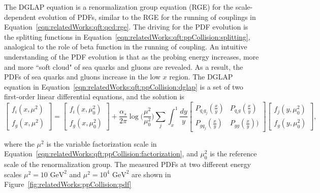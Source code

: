 \noindent The DGLAP equation is a renormalization group equation (RGE) for the scale-dependent evolution of PDFs, similar to the RGE for the running of couplings in Equation~\ref{eqn:relatedWorks:qft:qcd:rge}. The driving for the PDF evolution is the splitting functions in Equation~\ref{eqn:relatedWorks:qft:ppCollision:splitting}, analogical to the role of beta function in the running of coupling.  An intuitive understanding of the PDF evolution is that as the probing energy increases, more and more ``soft cloud" of sea quarks and gluons are revealed. As a result, the PDFs of sea quarks and gluons increase in the low $x$ region. The DGLAP equation in Equation~\ref{eqn:relatedWorks:qft:ppCollision:dglap} is a set of two first-order linear differential equations, and the solution is
\begin{equation}
    \begin{bmatrix} f_i(x,\mu^2) \\ f_g(x,\mu^2) \end{bmatrix} = \begin{bmatrix} f_i(x,\mu_0^2) \\ f_g(x,\mu_0^2) \end{bmatrix} + 
    \frac{\alpha_s}{2\pi} \log\bigg(\frac{\mu^2}{\mu_0^2}\bigg) 
    \sum_j \int_x^1 
    \frac{dy}{y}
    \begin{bmatrix} P_{q_i q_j}(\frac{x}{y}) & P_{q_i g}(\frac{x}{y}) \\ P_{g q_j}(\frac{x}{y}) & P_{gg}(\frac{x}{y})) \end{bmatrix} \begin{bmatrix} f_j(y,\mu^2_0) \\ f_g(y,\mu^2_0) \end{bmatrix}, 
\end{equation}

\noindent where the $\mu^2$ is the variable factorization scale in Equation~\ref{eqn:relatedWorks:qft:ppCollision:factorization}, and $\mu^2_0$ is the reference scale of the renormalization group. The measured PDFs at two different energy scales  $\mu^2=10 \text{ GeV}^2$ and $\mu^2=10^4 \text{ GeV}^2$ are shown in Figure~\ref{fig:relatedWorks:ppCollision:pdf}


